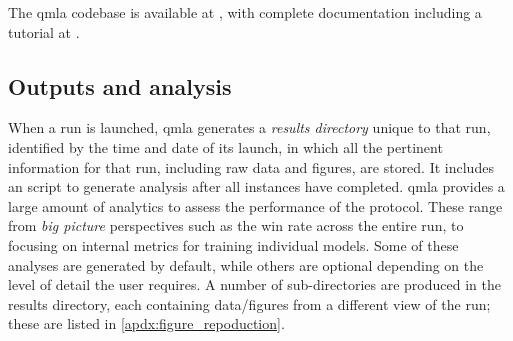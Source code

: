 The \gls{qmla} codebase is available at \cite{flynn2021QMLA},  
    with complete documentation including a tutorial at \cite{qmla_docs}. 

\subsection{Outputs and analysis}\label{sec:qmla_outputs}
When a \gls{run} is launched, \gls{qmla} generates a \emph{\gls{results directory}} unique to that \gls{run}, 
    identified by the time and date of its launch,
    in which all the pertinent information for that \gls{run}, including raw data and figures, are stored. 
It includes an  script to generate analysis after all \glspl{instance} have completed\footnotemark. 
\gls{qmla} provides a large amount of analytics to assess the performance of the protocol. 
These range from \emph{big picture} perspectives such as the  \gls{win rate}  across the entire \gls{run}, 
    to focusing on internal metrics for training individual models.
Some of these analyses are generated by default, while others are optional depending on the 
    level of detail the user requires. 
A number of sub-directories are produced in the \gls{results directory}, 
    each containing data/figures from a different view of the \gls{run};
    these are listed in \cref{apdx:figure_repoduction}.
\par 

